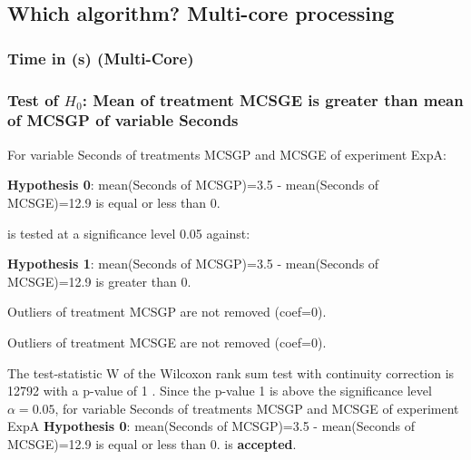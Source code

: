 \documentclass[18pt,c]{beamer}
\begin{document}
\subsection{Which algorithm? Multi-core processing}
 \begin{frame}
 \fontsize{8pt}{9pt}\selectfont
 \frametitle{ Time in (s) (Multi-Core) }

 \label{ExpAStatsTable011.tex}  
 \end{frame}

\begin{frame}[t]
 \frametitle{Test of $H_{0}$: Mean of treatment MCSGE is greater than mean of MCSGP of variable Seconds }
 \scriptsize
 For variable Seconds of treatments MCSGP and MCSGE of experiment ExpA:

\vspace{1mm}
{\bf Hypothesis 0}: mean(Seconds of MCSGP)=3.5 - mean(Seconds of MCSGE)=12.9 is equal or less than 0.


 \begin{center} is tested at a significance level 0.05 against: \end{center}

{\bf Hypothesis 1}: mean(Seconds of MCSGP)=3.5 - mean(Seconds of MCSGE)=12.9 is greater than 0.
\vspace{1mm}
\vspace{1mm}

 Outliers of treatment MCSGP  are not removed (coef=0).

 Outliers of treatment MCSGE  are not removed (coef=0).
\vspace{1mm}
 
 The test-statistic W of the Wilcoxon rank sum test with continuity correction is 12792 with a p-value of 1 .
 Since the p-value 1 is above the significance level $\alpha= 0.05 $,
 for variable Seconds of treatments MCSGP and MCSGE of experiment ExpA 
 {\bf Hypothesis 0}: mean(Seconds of MCSGP)=3.5 - mean(Seconds of MCSGE)=12.9 is equal or less than 0.
is {\bf accepted}.

 \end{frame}
\end{document}
